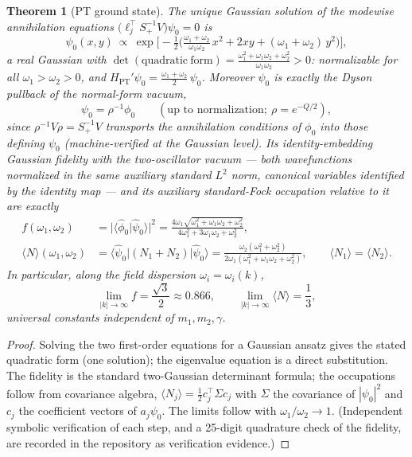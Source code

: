 \documentclass[11pt]{article}
\newtheorem{theorem}{Theorem}[section]
\theoremstyle{definition}
\theoremstyle{remark}
\newcommand{\w}{\omega}
\begin{document}
\begin{theorem}[PT ground state]\label{thm:groundstate}
The unique Gaussian solution of the modewise annihilation equations
$\big(\ell_j^{\top}S_+^{-1}V\big)\psi_0=0$ is
\begin{equation}
\psi_0(x,y)\ \propto\
\exp\!\Big[-\tfrac12\Big(\tfrac{\w_1+\w_2}{\w_1\w_2}\,x^2
+2xy+(\w_1+\w_2)\,y^2\Big)\Big],
\end{equation}
a \emph{real} Gaussian with
$\det(\mathrm{quadratic\ form})=\frac{\w_1^2+\w_1\w_2+\w_2^2}{\w_1\w_2}>0$:
normalizable for all $\w_1>\w_2>0$, and
$H_{\mathrm{PT}}'\psi_0=\tfrac{\w_1+\w_2}{2}\,\psi_0$.  Moreover
$\psi_0$ is exactly the Dyson pullback of the normal-form vacuum,
\begin{equation}\label{eq:pullback}
\psi_0=\rho^{-1}\phi_0
\qquad(\text{up to normalization};\ \rho=e^{-Q/2}),
\end{equation}
since $\rho^{-1}V\rho=S_+^{-1}V$ transports the annihilation conditions
of $\phi_0$ into those defining $\psi_0$ (machine-verified at the
Gaussian level).  Its \emph{identity-embedding Gaussian fidelity} with
the two-oscillator vacuum --- both wavefunctions normalized in the same
auxiliary standard $L^2$ norm, canonical variables identified by the
identity map --- and its \emph{auxiliary standard-Fock occupation}
relative to it are exactly
\begin{align}
f(\w_1,\w_2)&=\big|\langle\hat\phi_0|\hat\psi_0\rangle\big|^2
=\frac{4\w_1\sqrt{\w_1^2+\w_1\w_2+\w_2^2}}{4\w_1^2+3\w_1\w_2+\w_2^2},\\[2pt]
\langle N\rangle(\w_1,\w_2)
&=\langle\hat\psi_0|(N_1+N_2)|\hat\psi_0\rangle
=\frac{\w_2(\w_1^2+\w_2^2)}{2\w_1(\w_1^2+\w_1\w_2+\w_2^2)},
\qquad \langle N_1\rangle=\langle N_2\rangle .
\end{align}
In particular, along the field dispersion $\w_i=\w_i(k)$,
\begin{equation}\label{eq:universal}
\lim_{|k|\to\infty}f=\frac{\sqrt3}{2}\approx0.866,
\qquad
\lim_{|k|\to\infty}\langle N\rangle=\frac13 ,
\end{equation}
universal constants independent of $m_1,m_2,\gamma$.
\end{theorem}

\begin{proof}
Solving the two first-order equations for a Gaussian ansatz gives the stated
quadratic form (one solution); the eigenvalue equation is a direct
substitution.  The fidelity is the standard two-Gaussian determinant formula;
the occupations follow from covariance algebra,
$\langle N_j\rangle=\tfrac12 c_j^{\top}\Sigma c_j$ with
$\Sigma$ the covariance of $|\psi_0|^2$ and $c_j$ the coefficient vectors of
$a_j\psi_0$.  The limits follow with $\w_1/\w_2\to1$.
(Independent symbolic verification of each step, and a 25-digit quadrature
check of the fidelity, are recorded in the repository as verification
evidence.)
\end{proof}
\end{document}
